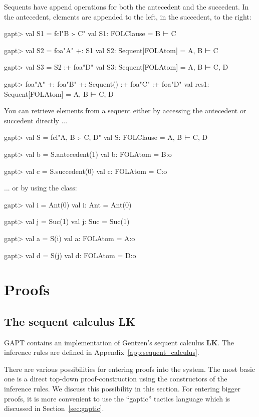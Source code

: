 \documentclass[a4paper,11pt]{book}
\newcommand{\LK}{\textbf{LK}}
\newcommand{\cli}[1]{{\ttfamily {#1}}}
\begin{document}
Sequents have append operations for both the antecedent and the succedent. In the antecedent,
elements are appended to the left, in the succedent, to the right:

\begin{clilisting}
gapt> val S1 = fcl"B :- C"
val S1: FOLClause = B ⊢ C

gapt> val S2 = foa"A" +: S1
val S2: Sequent[FOLAtom] = A, B ⊢ C

gapt> val S3 = S2 :+ foa"D"
val S3: Sequent[FOLAtom] = A, B ⊢ C, D

gapt> foa"A" +: foa"B" +: Sequent() :+ foa"C" :+ foa"D"
val res1: Sequent[FOLAtom] = A, B ⊢ C, D

\end{clilisting}

You can retrieve elements from a sequent either by accessing the antecedent
or succedent directly ...
\begin{clilisting}
gapt> val S = fcl"A, B :- C, D"
val S: FOLClause = A, B ⊢ C, D

gapt> val b = S.antecedent(1)
val b: FOLAtom = B:o

gapt> val c = S.succedent(0)
val c: FOLAtom = C:o

\end{clilisting}
... or by using the \cli{SequentIndex} class:

\begin{clilisting}
gapt> val i = Ant(0)
val i: Ant = Ant(0)

gapt> val j = Suc(1)
val j: Suc = Suc(1)

gapt> val a = S(i)
val a: FOLAtom = A:o

gapt> val d = S(j)
val d: FOLAtom = D:o

\end{clilisting}


\section{Proofs}\label{sec:entering_proofs}

\subsection{The sequent calculus LK}
GAPT contains an implementation of Gentzen's sequent calculus {\LK}.
The inference rules are defined in Appendix~\ref{app:sequent_calculus}.

There are various possibilities for entering proofs into the system. The most
basic one is a direct top-down proof-construction using the constructors
of the inference rules. We discuss this possibility in this section. For
entering bigger proofs, it is more convenient to use the ``gaptic'' tactics
language which is discussed in Section~\ref{sec:gaptic}.
\end{document}

